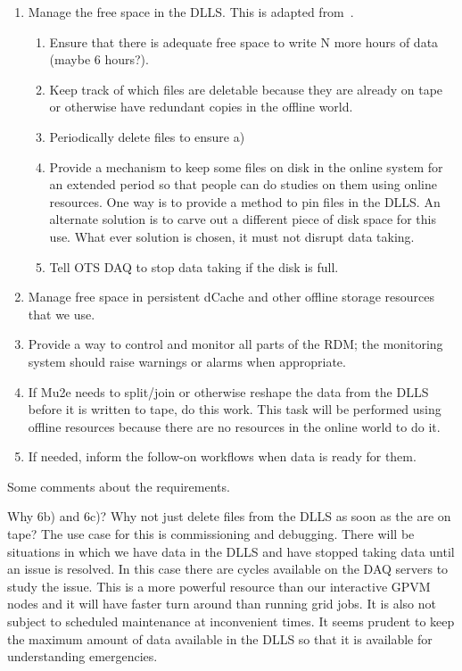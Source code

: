 \begin{enumerate}
\item Manage the free space in the DLLS.  This is adapted from~\cite{OnlineMonitoring}.
  \begin{enumerate}
   \item Ensure that there is adequate free space to write N more hours of data (maybe 6 hours?).
   \item Keep track of which files are deletable because they are already on tape or otherwise have redundant copies in the offline world.
   \item Periodically delete files to ensure a)
   \item Provide a mechanism to keep some files on disk in the online system for an extended period so that
     people can do studies on them using online resources. One way is to provide
     a method to pin files in the DLLS.  An alternate solution is to carve out a different piece of disk
     space for this use.
     What ever solution is chosen, it must not disrupt data taking.
   \item Tell OTS DAQ to stop data taking if the disk is full.
  \end{enumerate}
\item Manage free space in persistent dCache and other offline storage resources that we use.
\item Provide a way to control and monitor all parts of the RDM; the monitoring system should raise warnings or alarms when appropriate.
\item If Mu2e needs to split/join or otherwise reshape the data from the DLLS before it is written to tape, do this work.
  This task will be performed using offline resources because there are no resources in the online world to do it.
\item If needed, inform the follow-on workflows when data is ready for them.
\end{enumerate}

Some comments about the requirements.

Why 6b) and 6c)?
Why not just delete files from the DLLS as soon as the are on tape?
The use case for this is commissioning and debugging.
There will be situations in which we have data in the DLLS and have stopped taking data
until an issue is resolved.
In this case there are cycles available on the DAQ servers to study the issue.
This is a more powerful resource than our interactive GPVM nodes and
it will have faster turn around than running grid jobs.
It is also not subject to scheduled maintenance at inconvenient times.
It seems prudent to keep the maximum amount of data available in the DLLS so that
it is available for understanding emergencies.
